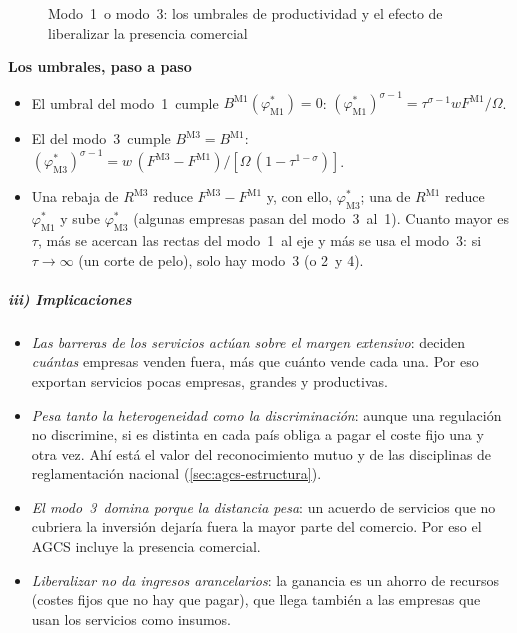\documentclass[11pt]{article}
\begin{document}
\begin{figure}[H]
\centering
\caption{Modo~1~o modo~3: los umbrales de productividad y el efecto de liberalizar la presencia comercial}\label{fig:modos-hmy}
\end{figure}

\begin{anotaciones}
\textbf{Los umbrales, paso a paso}
\begin{itemize}
\item El umbral del modo~1~cumple $B^{\mathrm{M1}}(\varphi^*_{\mathrm{M1}})=0$: $(\varphi^*_{\mathrm{M1}})^{\sigma-1}=\tau^{\sigma-1}wF^{\mathrm{M1}}/\Omega$.
\item El del modo~3~cumple $B^{\mathrm{M3}}=B^{\mathrm{M1}}$: $(\varphi^*_{\mathrm{M3}})^{\sigma-1}=w\,(F^{\mathrm{M3}}-F^{\mathrm{M1}})/[\Omega\,(1-\tau^{1-\sigma})]$.
\item Una rebaja de $R^{\mathrm{M3}}$ reduce $F^{\mathrm{M3}}-F^{\mathrm{M1}}$ y, con ello, $\varphi^*_{\mathrm{M3}}$; una de $R^{\mathrm{M1}}$ reduce $\varphi^*_{\mathrm{M1}}$ y sube $\varphi^*_{\mathrm{M3}}$ (algunas empresas pasan del modo~3~al~1). Cuanto mayor es $\tau$, más se acercan las rectas del modo~1~al eje y más se usa el modo~3: si $\tau\to\infty$ (un corte de pelo), solo hay modo~3 (o 2~y 4). \findemo
\end{itemize}
\end{anotaciones}

\subparagraph{iii) Implicaciones}

\begin{itemize}
\item \emph{Las barreras de los servicios actúan sobre el margen extensivo}: deciden \emph{cuántas} empresas venden fuera, más que cuánto vende cada una. Por eso exportan servicios pocas empresas, grandes y productivas.
\item \emph{Pesa tanto la heterogeneidad como la discriminación}: aunque una regulación no discrimine, si es distinta en cada país obliga a pagar el coste fijo una y otra vez. Ahí está el valor del reconocimiento mutuo y de las disciplinas de reglamentación nacional (\ref{sec:agcs-estructura}).
\item \emph{El modo~3~domina porque la distancia pesa}: un acuerdo de servicios que no cubriera la inversión dejaría fuera la mayor parte del comercio. Por eso el AGCS incluye la presencia comercial.
\item \emph{Liberalizar no da ingresos arancelarios}: la ganancia es un ahorro de recursos (costes fijos que no hay que pagar), que llega también a las empresas que usan los servicios como insumos.
\end{itemize}
\end{document}
